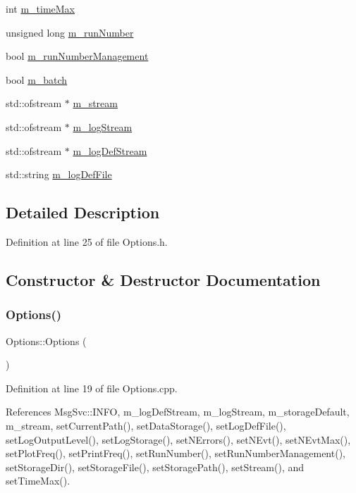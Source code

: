 \begin{DoxyCompactItemize}
int \hyperlink{classOptions_a2584abb6745a082f73e2917732cd00e1}{m\+\_\+time\+Max}
\item 
unsigned long \hyperlink{classOptions_a1762c644c5f87feabe12f84f17a1a351}{m\+\_\+run\+Number}
\item 
bool \hyperlink{classOptions_a2ad2d67b98fc5fbea4cbbd781ccb6183}{m\+\_\+run\+Number\+Management}
\item 
bool \hyperlink{classOptions_ae4461f1dd3357c0478098fc32e809405}{m\+\_\+batch}
\item 
std\+::ofstream $\ast$ \hyperlink{classOptions_a8c5485cd614fa90de6b1aa85a7d2191b}{m\+\_\+stream}
\item 
std\+::ofstream $\ast$ \hyperlink{classOptions_a65c3a025880fb38373b599b87d600eef}{m\+\_\+log\+Stream}
\item 
std\+::ofstream $\ast$ \hyperlink{classOptions_aebb2db3fb07ea1f73b27bde841be69d8}{m\+\_\+log\+Def\+Stream}
\item 
std\+::string \hyperlink{classOptions_abaef6cdcc8422b199084510d173edbe6}{m\+\_\+log\+Def\+File}
\end{DoxyCompactItemize}


\subsection{Detailed Description}


Definition at line 25 of file Options.\+h.



\subsection{Constructor \& Destructor Documentation}
\mbox{\label{classOptions_ab72fb640172a6109e34c8a5366563753}} 
\subsubsection{\texorpdfstring{Options()}{Options()}}
{\footnotesize\ttfamily Options\+::\+Options (\begin{DoxyParamCaption}{ }\end{DoxyParamCaption})}



Definition at line 19 of file Options.\+cpp.



References Msg\+Svc\+::\+I\+N\+FO, m\+\_\+log\+Def\+Stream, m\+\_\+log\+Stream, m\+\_\+storage\+Default, m\+\_\+stream, set\+Current\+Path(), set\+Data\+Storage(), set\+Log\+Def\+File(), set\+Log\+Output\+Level(), set\+Log\+Storage(), set\+N\+Errors(), set\+N\+Evt(), set\+N\+Evt\+Max(), set\+Plot\+Freq(), set\+Print\+Freq(), set\+Run\+Number(), set\+Run\+Number\+Management(), set\+Storage\+Dir(), set\+Storage\+File(), set\+Storage\+Path(), set\+Stream(), and set\+Time\+Max().


